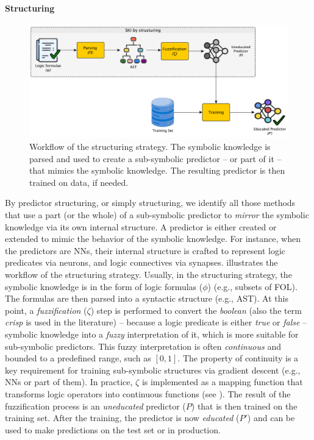 \paragraph{Structuring}\label{par:structuring}
%
\begin{figure}
    \centering
    \includegraphics[width=.9\linewidth]{figures/workflow-structuring}
    \caption[SKI workflow of structuring strategy]{
        Workflow of the structuring strategy.
        The symbolic knowledge is parsed and used to create a sub-symbolic predictor -- or part of it -- that mimics the symbolic knowledge.
        The resulting predictor is then trained on data, if needed.
    }
    \label{fig:workflow-structuring}
\end{figure}
%
By predictor structuring, or simply structuring, we identify all those methods that use a part (or the whole) of a sub-symbolic predictor to \emph{mirror} the symbolic knowledge via its own internal structure.
%
A predictor is either created or extended to mimic the behavior of the symbolic knowledge.
%
For instance, when the predictors are \glspl{NN}, their internal structure is crafted to represent logic predicates via neurons, and logic connectives via synapses.
%
 illustrates the workflow of the structuring strategy.
%
Usually, in the structuring strategy, the symbolic knowledge is in the form of logic formulas ($\phi$) (e.g., subsets of \gls{FOL}).
%
The formulas are then parsed into a syntactic structure (e.g., \gls{AST}).
%
At this point, a \emph{fuzzification} ($\zeta$) step is performed to convert the \emph{boolean} (also the term \emph{crisp} is used in the literature) -- because a logic predicate is either \emph{true} or \emph{false} -- symbolic knowledge into a \emph{fuzzy} interpretation of it, which is more suitable for sub-symbolic predictors.
%
This fuzzy interpretation is often \emph{continuous} and bounded to a predefined range, such as \([0, 1]\).
%
The property of continuity is a key requirement for training sub-symbolic structures via gradient descent (e.g., \glspl{NN} or part of them).
%
In practice, $\zeta$ is implemented as a mapping function that transforms logic operators into continuous functions (see ).
%
The result of the fuzzification process is an \emph{uneducated} predictor ($P$) that is then trained on the training set.
%
After the training, the predictor is now \emph{educated} ($P'$) and can be used to make predictions on the test set or in production.
%

